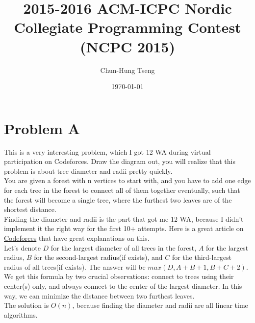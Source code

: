 \documentclass[10pt]{article}
\title{2015-2016 ACM-ICPC Nordic Collegiate Programming Contest (NCPC 2015)} %
\author{Chun-Hung Tseng}
\date{\today}
\begin{document}
 

\begin{titlepage}
\maketitle
\end{titlepage}




\section*{Problem A}

This is a very interesting problem, which I got 12 WA during virtual participation on Codeforces. Draw the diagram out, you will realize that this problem is about tree diameter and radii pretty quickly. \\

You are given a forest with n vertices to start with, and you have to add one edge for each tree in the forest to connect all of them together eventually, such that the forest will become a single tree, where the furthest two leaves are of the shortest distance.\\ 

Finding the diameter and radii is the part that got me 12 WA, because I didn't implement it the right way for the first 10+ attempts. Here is a great article on \href{http://codeforces.com/blog/entry/17974}{Codeforces} that have great explanations on this. \\

Let's denote $D$ for the largest diameter of all trees in the forest, $A$ for the largest radius, $B$ for the second-largest radius(if exists), and $C$ for the third-largest radius of all trees(if exists). The answer will be $max(D, A+B+1, B+C+2)$. We get this formula by two crucial observations: connect to trees using their center(s) only, and always connect to the center of the largest diameter. In this way, we can minimize the distance between two furthest leaves.\\

The solution is $O(n)$, because finding the diameter and radii are all linear time algorithms.\\
\end{document}
